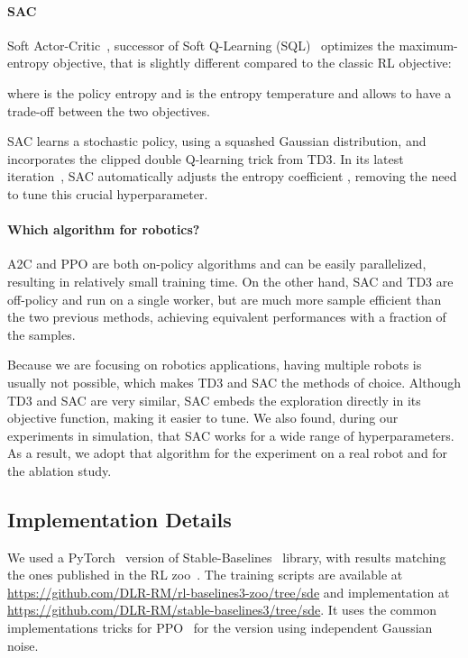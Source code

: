 \documentclass{article}
\newcommand{\aac}{\textsc{A2C}\xspace}
\newcommand{\ppo}{\textsc{PPO}\xspace}
\newcommand{\sac}{\textsc{SAC}\xspace}
\newcommand{\tddd}{\textsc{TD3}\xspace}
\begin{document}
\paragraph{\sac}
Soft Actor-Critic~\citep{haarnoja2017reinforcement}, successor of Soft Q-Learning (SQL)~\cite{haarnoja2018soft} optimizes the maximum-entropy objective, that is slightly different compared to the classic RL objective:

where  is the policy entropy and  is the entropy temperature and allows to have a trade-off between the two objectives.

\sac learns a stochastic policy, using a squashed Gaussian distribution, and incorporates the clipped double Q-learning trick from \tddd.
In its latest iteration~\citep{haarnoja2018applications}, \sac automatically adjusts the entropy coefficient , removing the need to tune this crucial hyperparameter.

\paragraph{Which algorithm for robotics?}

\aac and \ppo are both on-policy algorithms and can be easily parallelized, resulting in relatively small training time.
On the other hand, \sac and \tddd are off-policy and run on a single worker, but are much more sample efficient than the two previous methods, achieving equivalent performances with a fraction of the samples.

Because we are focusing on robotics applications, having multiple robots is usually not possible, which makes \tddd and \sac the methods of choice. Although \tddd and \sac are very similar, \sac embeds the exploration directly in its objective function, making it easier to tune. We also found, during our experiments in simulation, that \sac works for a wide range of hyperparameters. As a result, we adopt that algorithm for the experiment on a real robot and for the ablation study.


\subsection{Implementation Details}
\label{sec:implementation}

We used a PyTorch~\citep{raffin2019baselines3} version of Stable-Baselines~\citep{hill2018stable} library, with results matching the ones published in the RL zoo~\citep{raffin2018zoo}.
The training scripts are available at \url{https://github.com/DLR-RM/rl-baselines3-zoo/tree/sde} and implementation at \url{https://github.com/DLR-RM/stable-baselines3/tree/sde}.
It uses the common implementations tricks for \ppo~\citep{engstrom2020implementation} for the version using independent Gaussian noise.
\end{document}
